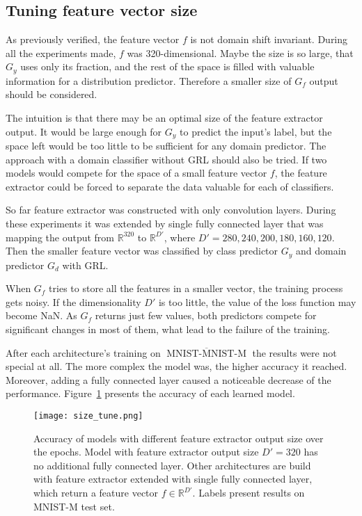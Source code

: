 \documentclass[shortabstract, inz, english]{iithesis}
\DeclareMathOperator{\mnistM}{MNIST-MNIST-M}
\newcommand{\mnist}{$\overline{\mnistM}$ }
\begin{document}
\subsection{Tuning feature vector size}
As previously verified, the feature vector $f$ is not domain shift invariant. During all the experiments made, $f$ was 320-dimensional. Maybe the size is so large, that $G_{y}$ uses only its fraction, and the rest of the space is filled with valuable information for a distribution predictor. Therefore a smaller size of $G_{f}$ output should be considered.
\par
The intuition is that there may be an optimal size of the feature extractor output. It would be large enough for $G_{y}$ to predict the input's label, but the space left would be too little to be sufficient for any domain predictor. The approach with a domain classifier without GRL should also be tried. If two models would compete for the space of a small feature vector $f$, the feature extractor could be forced to separate the data valuable for each of classifiers.
\par
So far feature extractor was constructed with only convolution layers. During these experiments it was extended by single fully connected layer that was mapping the output from $\mathbb{R}^{320}$ to $\mathbb{R}^{D'}$, where $D' = 280, 240, 200, 180, 160, 120$. Then the smaller feature vector was classified by class predictor $G_{y}$ and domain predictor $G_{d}$ with GRL. 
\par
When $G_{f}$ tries to store all the features in a smaller vector, the training process gets noisy. If the dimensionality $D'$ is too little, the value of the loss function may become NaN. As $G_{f}$ returns just few values, both predictors compete for significant changes in most of them, what lead to the failure of the training.
\par
After each architecture's training on \mnist the results were not special at all. The more complex the model was, the higher accuracy it reached. Moreover, adding a fully connected layer caused a noticeable decrease of the performance. Figure~\ref{fig:size_tune} presents the accuracy of each learned model. 
\begin{figure}[htb]%
    \centering
    \texttt{[image: size\_tune.png]}%
    \caption{Accuracy of models with different feature extractor output size over the epochs. Model with feature extractor output size $D'=320$ has no additional fully connected layer. Other architectures are build with feature extractor extended with single fully connected layer, which return a feature vector $f \in \mathbb{R}^{D'}$. Labels present results on MNIST-M test set. }
    \label{fig:size_tune}%
\end{figure}
\end{document}

